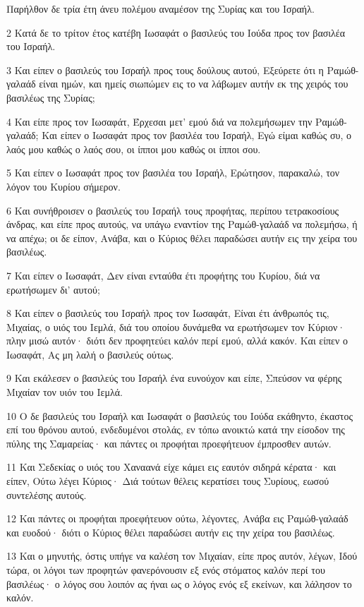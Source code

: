 \par Παρήλθον δε τρία έτη άνευ πολέμου αναμέσον της Συρίας και του Ισραήλ.
\par 2 Κατά δε το τρίτον έτος κατέβη Ιωσαφάτ ο βασιλεύς του Ιούδα προς τον βασιλέα του Ισραήλ.
\par 3 Και είπεν ο βασιλεύς του Ισραήλ προς τους δούλους αυτού, Εξεύρετε ότι η Ραμώθ-γαλαάδ είναι ημών, και ημείς σιωπώμεν εις το να λάβωμεν αυτήν εκ της χειρός του βασιλέως της Συρίας;
\par 4 Και είπε προς τον Ιωσαφάτ, Έρχεσαι μετ' εμού διά να πολεμήσωμεν την Ραμώθ-γαλαάδ; Και είπεν ο Ιωσαφάτ προς τον βασιλέα του Ισραήλ, Εγώ είμαι καθώς συ, ο λαός μου καθώς ο λαός σου, οι ίπποι μου καθώς οι ίπποι σου.
\par 5 Και είπεν ο Ιωσαφάτ προς τον βασιλέα του Ισραήλ, Ερώτησον, παρακαλώ, τον λόγον του Κυρίου σήμερον.
\par 6 Και συνήθροισεν ο βασιλεύς του Ισραήλ τους προφήτας, περίπου τετρακοσίους άνδρας, και είπε προς αυτούς, να υπάγω εναντίον της Ραμώθ-γαλαάδ να πολεμήσω, ή να απέχω; οι δε είπον, Ανάβα, και ο Κύριος θέλει παραδώσει αυτήν εις την χείρα του βασιλέως.
\par 7 Και είπεν ο Ιωσαφάτ, Δεν είναι ενταύθα έτι προφήτης του Κυρίου, διά να ερωτήσωμεν δι' αυτού;
\par 8 Και είπεν ο βασιλεύς του Ισραήλ προς τον Ιωσαφάτ, Είναι έτι άνθρωπός τις, Μιχαίας, ο υιός του Ιεμλά, διά του οποίου δυνάμεθα να ερωτήσωμεν τον Κύριον· πλην μισώ αυτόν· διότι δεν προφητεύει καλόν περί εμού, αλλά κακόν. Και είπεν ο Ιωσαφάτ, Ας μη λαλή ο βασιλεύς ούτως.
\par 9 Και εκάλεσεν ο βασιλεύς του Ισραήλ ένα ευνούχον και είπε, Σπεύσον να φέρης Μιχαίαν τον υιόν του Ιεμλά.
\par 10 Ο δε βασιλεύς του Ισραήλ και Ιωσαφάτ ο βασιλεύς του Ιούδα εκάθηντο, έκαστος επί του θρόνου αυτού, ενδεδυμένοι στολάς, εν τόπω ανοικτώ κατά την είσοδον της πύλης της Σαμαρείας· και πάντες οι προφήται προεφήτευον έμπροσθεν αυτών.
\par 11 Και Σεδεκίας ο υιός του Χαναανά είχε κάμει εις εαυτόν σιδηρά κέρατα· και είπεν, Ούτω λέγει Κύριος· Διά τούτων θέλεις κερατίσει τους Συρίους, εωσού συντελέσης αυτούς.
\par 12 Και πάντες οι προφήται προεφήτευον ούτω, λέγοντες, Ανάβα εις Ραμώθ-γαλαάδ και ευοδού· διότι ο Κύριος θέλει παραδώσει αυτήν εις την χείρα του βασιλέως.
\par 13 Και ο μηνυτής, όστις υπήγε να καλέση τον Μιχαίαν, είπε προς αυτόν, λέγων, Ιδού τώρα, οι λόγοι των προφητών φανερόνουσιν εξ ενός στόματος καλόν περί του βασιλέως· ο λόγος σου λοιπόν ας ήναι ως ο λόγος ενός εξ εκείνων, και λάλησον το καλόν.
